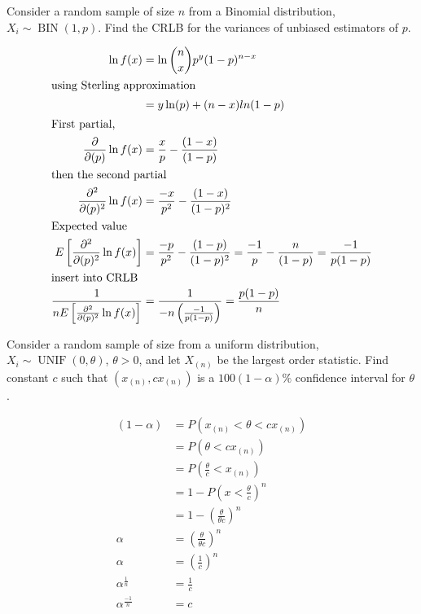 \documentclass[answers]{exam}
\begin{document}
\begin{questions}
\question 
Consider a random sample of size \(n\) from a Binomial distribution,
\(X_i\sim\operatorname{BIN}(1,p)\). 
Find the CRLB for the variances of unbiased estimators of \(p\).
\begin{solution}
	\begin{align*}
		\ln f(x) &= \ln\binom{n}{x}p^y(1-p)^{n-x} \\
		\intertext{using Sterling approximation}
			&= y \ln(p) + (n-x)ln(1-p) \\
	\intertext{First partial,}
		\frac{\partial}{\partial(p)}\ln f(x) &= \frac{x}{p} -\frac{(1-x)}{(1-p)} \\
	\intertext{then the second partial}
		\frac{\partial^2}{\partial(p)^2}\ln f(x)
			&= \frac{-x}{p^2} -\frac{(1-x)}{(1-p)^2} \\
	\intertext{Expected value}
		E\left[\frac{\partial^2}{\partial(p)^2}\ln f(x)\right]
		&= \frac{-p}{p^2} -\frac{(1-p)}{(1-p)^2}
		= \frac{-1}{p} -\frac{n}{(1-p)} 
		= \frac{-1}{p(1-p)} \\
	\intertext{insert into CRLB}
		\frac{1}{nE\left[\frac{\partial^2}{\partial(p)^2}\ln f(x)\right]}
		&= \frac{1}{-n\left(\frac{-1}{p(1-p)}\right)}
		= \frac{p(1-p)}{n}
	\end{align*}
\end{solution}

\question 
Consider a random sample of size from a uniform distribution,
\(X_i\sim\operatorname{UNIF}(0,\theta)\), \(\theta>0\),
and let \(X_{(n)}\) be the largest order statistic. 
Find constant \(c\) such that \((x_{(n)},cx_{(n)})\) is a \(100(1-\alpha)\%\) 
confidence interval for \(\theta\).
\begin{solution}
	\begin{align*}
		(1-\alpha) &= P(x_{(n)}<\theta<cx_{(n)}) \\
		&= P(\theta<cx_{(n)}) \\
		&= P(\frac{\theta}{c}<x_{(n)}) \\
		&= 1-P(x<\frac{\theta}{c})^n \\
		&= 1-(\frac{\theta}{\theta c})^n \\
		\alpha	&= (\frac{\theta}{\theta c})^n \\
		\alpha	&= (\frac{1}{c})^n \\
		\alpha^{\frac{1}{n}}	&= \frac{1}{c} \\
		\alpha^{\frac{-1}{n}}	&= c \\
	\end{align*}
\end{solution}


\end{questions}
\end{document}
